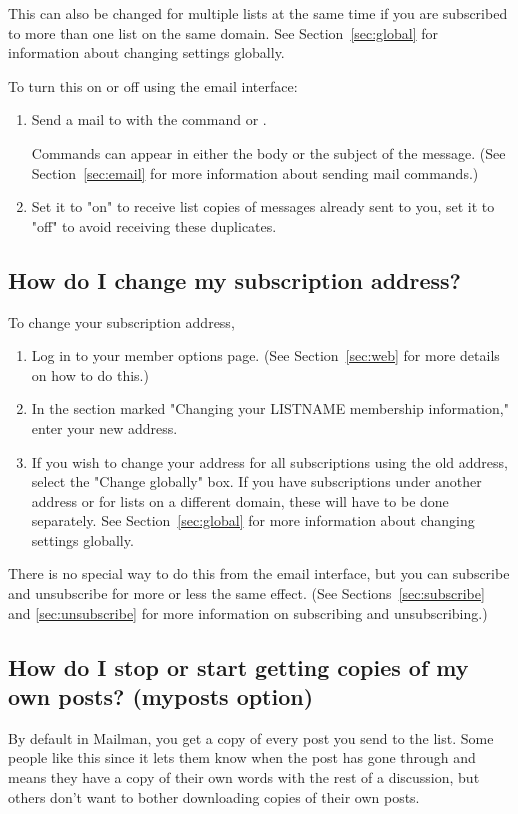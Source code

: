 \documentclass{howto}
\begin{document}
This can also be changed for multiple lists at the same time if you are subscribed to 
more than one list on the same domain.  See Section~\ref{sec:global} for 
information about changing settings globally.

To turn this on or off using the email interface:
\begin{enumerate}
   \item Send a mail to  with the command
    or .

   Commands can appear
   in either the body or the subject of the message.  (See
   Section~\ref{sec:email} for more information about sending mail
   commands.)
	\item Set it to "on" to receive list copies of messages already sent
	to you, set it to "off" to avoid receiving these duplicates.
\end{enumerate}


\subsection{How do I change my subscription address?\label{sec:changeaddress}}
To change your subscription address, 
\begin{enumerate}
	\item Log in to your member options page.  (See Section~\ref{sec:web} 
	for more details on how to do this.)
	\item In the section marked "Changing your LISTNAME membership information,"
	enter your new address.
	\item If you wish to change your address for all subscriptions using the 
	old address, select the "Change globally" box.  If you have subscriptions
	under another address or for lists on a different domain, these will have
	to be done separately. See Section~\ref{sec:global} for more
	information about changing settings globally.
\end{enumerate}

There is no special way to do this from the email interface, but you can 
subscribe and unsubscribe for more or less the same effect.  (See 
Sections~\ref{sec:subscribe} and \ref{sec:unsubscribe} for more information
on subscribing and unsubscribing.)

\subsection{How do I stop or start getting copies of my own posts? (myposts
	option)\label{sec:getown}}
By default in Mailman, you get a copy of every post you send to the list.  
Some people like this since it lets them know when the post has gone through
and means they have a copy of their own words with the rest of a discussion, 
but others don't want to bother downloading copies of their own posts.
\end{document}
